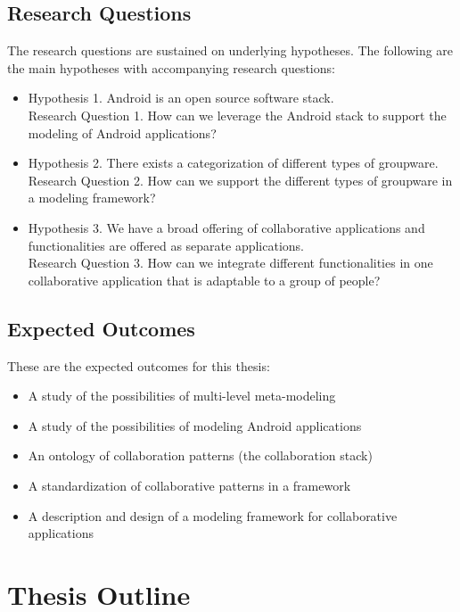 \subsection{Research Questions}

The research questions are sustained on underlying hypotheses. The following are the main hypotheses with accompanying research questions:

\begin{itemize}
\item{Hypothesis 1. Android is an open source software stack. \\
Research Question 1. How can we leverage the Android stack to support the modeling of Android applications?}
\item{Hypothesis 2. There exists a categorization of different types of groupware. \\
Research Question 2. How can we support the different types of groupware in a modeling framework?}
\item{Hypothesis 3. We have a broad offering of collaborative applications and functionalities are offered as separate applications. \\
Research Question 3. How can we integrate different functionalities in one collaborative application that is adaptable to a group of people?}
\end{itemize}

\subsection{Expected Outcomes}

These are the expected outcomes for this thesis:

\begin{itemize}
\item{A study of the possibilities of multi-level meta-modeling}
\item{A study of the possibilities of modeling Android applications}
\item{An ontology of collaboration patterns (the collaboration stack)}
\item{A standardization of collaborative patterns in a framework}
\item{A description and design of a modeling framework for collaborative applications}
\end{itemize}

\section{Thesis Outline}

